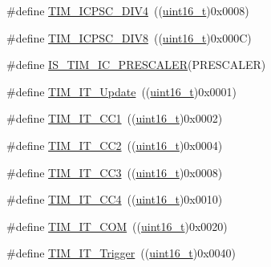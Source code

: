 \begin{DoxyCompactItemize}
\item 
\#define \hyperlink{group___t_i_m___input___capture___prescaler_gaf5a675046430fa0f0c95b0dac612828f}{T\+I\+M\+\_\+\+I\+C\+P\+S\+C\+\_\+\+D\+I\+V4}~((\hyperlink{_p_e___types_8h_a1f1825b69244eb3ad2c7165ddc99c956}{uint16\+\_\+t})0x0008)
\item 
\#define \hyperlink{group___t_i_m___input___capture___prescaler_ga5086cb03c89a5c67b199d20b605f00cb}{T\+I\+M\+\_\+\+I\+C\+P\+S\+C\+\_\+\+D\+I\+V8}~((\hyperlink{_p_e___types_8h_a1f1825b69244eb3ad2c7165ddc99c956}{uint16\+\_\+t})0x000\+C)
\item 
\#define \hyperlink{group___t_i_m___input___capture___prescaler_ga91d219d7a210eb0a4bb49d72bda6b321}{I\+S\+\_\+\+T\+I\+M\+\_\+\+I\+C\+\_\+\+P\+R\+E\+S\+C\+A\+L\+ER}(P\+R\+E\+S\+C\+A\+L\+ER)
\item 
\#define \hyperlink{group___t_i_m__interrupt__sources_ga8fb63577fec9a3e7c7f5f3eb775ee624}{T\+I\+M\+\_\+\+I\+T\+\_\+\+Update}~((\hyperlink{_p_e___types_8h_a1f1825b69244eb3ad2c7165ddc99c956}{uint16\+\_\+t})0x0001)
\item 
\#define \hyperlink{group___t_i_m__interrupt__sources_ga02267a938ab4722c5013fffa447cf5a6}{T\+I\+M\+\_\+\+I\+T\+\_\+\+C\+C1}~((\hyperlink{_p_e___types_8h_a1f1825b69244eb3ad2c7165ddc99c956}{uint16\+\_\+t})0x0002)
\item 
\#define \hyperlink{group___t_i_m__interrupt__sources_ga60f6b6c424b62ca58d3fafd8f5955e4f}{T\+I\+M\+\_\+\+I\+T\+\_\+\+C\+C2}~((\hyperlink{_p_e___types_8h_a1f1825b69244eb3ad2c7165ddc99c956}{uint16\+\_\+t})0x0004)
\item 
\#define \hyperlink{group___t_i_m__interrupt__sources_ga6aef020aebafd9e585283fbbaf8b841f}{T\+I\+M\+\_\+\+I\+T\+\_\+\+C\+C3}~((\hyperlink{_p_e___types_8h_a1f1825b69244eb3ad2c7165ddc99c956}{uint16\+\_\+t})0x0008)
\item 
\#define \hyperlink{group___t_i_m__interrupt__sources_ga1dce7f1bc32a258f2964cb7c05f413a6}{T\+I\+M\+\_\+\+I\+T\+\_\+\+C\+C4}~((\hyperlink{_p_e___types_8h_a1f1825b69244eb3ad2c7165ddc99c956}{uint16\+\_\+t})0x0010)
\item 
\#define \hyperlink{group___t_i_m__interrupt__sources_gaeb7eff6c39922814e7ee47c0820c3d9f}{T\+I\+M\+\_\+\+I\+T\+\_\+\+C\+OM}~((\hyperlink{_p_e___types_8h_a1f1825b69244eb3ad2c7165ddc99c956}{uint16\+\_\+t})0x0020)
\item 
\#define \hyperlink{group___t_i_m__interrupt__sources_ga339629d21f2490729b28905f5c04bad1}{T\+I\+M\+\_\+\+I\+T\+\_\+\+Trigger}~((\hyperlink{_p_e___types_8h_a1f1825b69244eb3ad2c7165ddc99c956}{uint16\+\_\+t})0x0040)

\end{DoxyCompactItemize}
